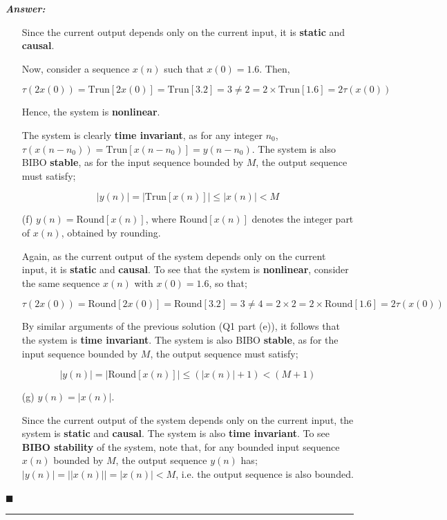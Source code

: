 \documentclass[12pt]{article}
\theoremstyle{definition}
\newenvironment{answer}{
    \textbf{\textit{Answer:}} \qquad
}{\hfill $\blacksquare$ \\ \begin{center}
    \rule{0.6\linewidth}{0.5px}    
\end{center}
}
\begin{document}
\begin{answer}
\begin{enumerate}
        Since the current output depends only on the current input, it is \textbf{static} and \textbf{causal}. 
        
        Now, consider a sequence $x(n)$ such that $x(0) = 1.6$. Then, 

        $$
        \tau(2x(0)) = \text{Trun}[2x(0)] = \text{Trun}[3.2] = 3 \neq 2 = 2 \times \text{Trun}[1.6] = 2 \tau(x(0)) 
        $$

        Hence, the system is \textbf{nonlinear}. 

        The system is clearly \textbf{time invariant}, as for any integer $n_0$, $\tau(x(n-n_0)) = \text{Trun}[x(n-n_0)] = y(n-n_0)$. The system is also BIBO \textbf{stable}, as for the input sequence bounded by $M$, the output sequence must satisfy;

        $$
        \vert y(n) \vert = \vert \text{Trun}[x(n)] \vert \leq \vert x(n) \vert < M
        $$

        \item[(f)] $y(n) = \text{Round}[x(n)]$, where $\text{Round}[x(n)]$ denotes the integer part of $x(n)$, obtained by rounding.
        
        Again, as the current output of the system depends only on the current input, it is \textbf{static} and \textbf{causal}. To see that the system is \textbf{nonlinear}, consider the same sequence $x(n)$ with $x(0) = 1.6$, so that;

        $$
        \tau(2x(0)) = \text{Round}[2x(0)] = \text{Round}[3.2] = 3 \neq 4 = 2\times 2 = 2 \times \text{Round}[1.6] = 2 \tau(x(0))
        $$

        By similar arguments of the previous solution (Q1 part (e)), it follows that the system is \textbf{time invariant}. The system is also BIBO \textbf{stable}, as for the input sequence bounded by $M$, the output sequence must satisfy;

        $$
        \vert y(n) \vert = \vert \text{Round}[x(n)] \vert \leq (\vert x(n) \vert + 1) < (M+1)
        $$     
        
        \item[(g)] $y(n) = \vert x(n)\vert$.
        
        Since the current output of the system depends only on the current input, the system is \textbf{static} and \textbf{causal}. The system is also \textbf{time invariant}. To see \textbf{BIBO stability} of the system, note that, for any bounded input sequence $x(n)$ bounded by $M$, the output sequence $y(n)$ has; $\vert y(n) \vert = \vert \vert x(n) \vert \vert = \vert x(n) \vert < M$, i.e. the output sequence is also bounded.


\end{enumerate}
\end{answer}
\end{document}
